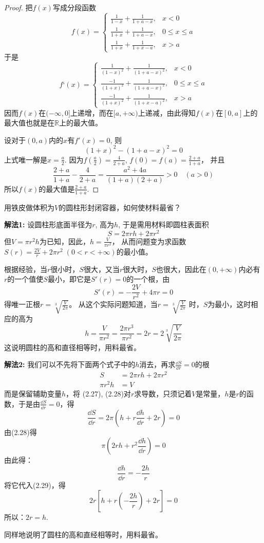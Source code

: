 \begin{proof}
把$f(x)$写成分段函数
\[f(x)=\begin{cases}
    \frac{1}{1-x}+\frac{1}{1+a-x}, & x<0\\
    \frac{1}{1+x}+\frac{1}{1+a-x}, & 0\le x\le a\\
    \frac{1}{1+x}+\frac{1}{1+x-a}, & x>a
\end{cases}\]
于是
\[f‘(x)=\begin{cases}
    \frac{1}{(1-x)^2}+\frac{1}{(1+a-x)^2}, & x<0\\
    \frac{-1}{(1+x)^2}+\frac{1}{(1+a-x)^2}, & 0\le x\le a\\
    \frac{-1}{(1+x)^2}+\frac{1}{(1+x-a)^2}, & x>a
\end{cases}\]
因而$f(x)$在$(-\infty, 0]$上递增，而在$[a,+\infty)$上递减，由此得知$f(x)$在$[0,a]$上的最大值也就是在$\mathbb{R}$上的最大值。

设对于$(0,a)$内的$x$有$f'(x)=0$, 则
\[(1+x)^2- (1+a-x)^2=0\]
上式唯一解是$x=\frac{a}{2}$. 
因为$f\left(\frac{a}{2}\right)=\frac{4}{2+a}$, $f(0)=f(a)=\frac{2+a}{1+a}$，
并且
\[\frac{2+a}{1+a}-\frac{4}{2+a}= \frac{a^2+4a}{(1+a) (2+a)}>0\quad  (a>0)\]
所以$f(x)$的最大值是$\frac{2+a}{1+a}$.
\end{proof}

\begin{example}
    用铁皮做体积为$V$的圆柱形封闭容器，如何使材料最省？
\end{example}


\begin{solution}
\textbf{解法1:} 设圆柱形底面半径为$r$, 高为$h$, 于是需用材料即圆柱表面积
\[S=2\pi rh+2\pi r^2\]
但$V=\pi r^2h$为已知，因此，$h=\frac{V}{\pi r^2}$，
从而问题变为求函数$S(r)=\frac{2V}{r}+2\pi r^2\; (0<r<+\infty)$的最小值。

根据经验，当$r$很小时，$S$很大，又当$r$很大时，$S$也很大，因此在$(0,+\infty)$内必有$r$的一个值使$S$最小，即它是$S'(r)=0$的一个根，由
\[S' (r) =-\frac{2V}{r^2}+4\pi r=0\]
得唯一正根$r=\sqrt[3]{\frac{V}{2\pi}}$。
从这个实际问题知道，当$r=\sqrt[3]{\frac{V}{2\pi}}$
时，$S$为最小，这时相应的高为
\[h=\frac{V}{\pi r^2}=\frac{2\pi r^3}{\pi r^2}=2r=2\sqrt[3]{\frac{V}{2\pi}}\]
这说明圆柱的高和直径相等时，用料最省。

\textbf{解法2:}  我们可以不先将下面两个式子中的$h$消去，再求$\frac{\dd S}{\dd r}=0$的根
\begin{align}
    S&=2\pi r h+2\pi r^2\\
    \pi r^2 h&=V
\end{align}
而是保留辅助变量$h$，将
(2.27), (2.28)对$r$求导数，只须记着$V$是常量，$h$是$r$的函数，于是由$\frac{\dd S}{\dd r}=0$，得
\begin{equation}
    \frac{\dd S}{\dd r}=2\pi\left(h+r\frac{\dd h}{\dd r}+2r\right)=0
\end{equation}
由(2.28)得
\begin{equation}
    \pi\left(2rh+r^2\frac{\dd h}{\dd r}\right)=0
\end{equation}
由此得：
\[\frac{\dd h}{\dd r}=-\frac{2h}{r}\]
将它代入(2.29)，得
\[2r\left[h+r\left(-\frac{2h}{r}\right)+2r\right]=0\]
所以：$2r=h$. 

同样地说明了圆柱的高和直经相等时，用料最省。
\end{solution}


